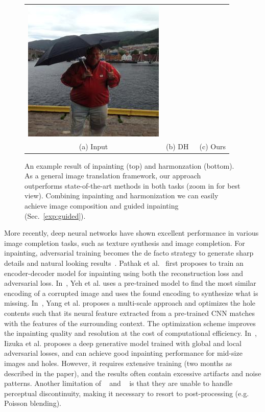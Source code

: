 \begin{figure}[t]
\begin{tabular}{ccc}
  \includegraphics[width=.34\textwidth]{figures/teaser/ours.jpg} \\
  (a) Input  & (b) DH~\cite{tsai2017deep} & (c) Ours  \\
\end{tabular}
\caption{An example result of inpainting (top) and harmonzation (bottom). As a general image translation framework, our approach outperforms state-of-the-art methods in both tasks (zoom in for best view). Combining inpainting and harmonization we can easily achieve image composition and guided inpainting (Sec.~\ref{exp:guided}).}
\label{fig:teaser}
\vspace{-10pt}
\end{figure}

More recently, deep neural networks have shown excellent performance in various image completion tasks, such as texture synthesis and image completion. For inpainting, adversarial training becomes the de facto strategy to generate sharp details and natural looking results~\cite{pathak2016context,yeh2016semantic,li2017generative,yang2017high,iizuka2017globally}. Pathak et al.~\cite{pathak2016context} first proposes to train an encoder-decoder model for inpainting using both the reconstruction loss and adversarial loss. In~\cite{yeh2016semantic}, Yeh et al. uses a pre-trained model to find the most similar encoding of a corrupted image and uses the found encoding to synthesize what is missing. In~\cite{yang2017high}, Yang et al. proposes a multi-scale approach and optimizes the hole contents such that its neural feature extracted from a pre-trained CNN matches with the features of the surrounding context. The optimization scheme improves the inpainting quality and resolution at the cost of computational efficiency. In~\cite{iizuka2017globally}, Iizuka et al. proposes a deep generative model trained with global and local adversarial losses, and can achieve good inpainting performance for mid-size images and holes. However, it requires extensive training (two months as described in the paper), and the results often contain excessive artifacts and noise patterns. Another limitation of ~\cite{yang2017high} and ~\cite{iizuka2017globally} is that they are unable to handle perceptual discontinuity, making it necessary to resort to post-processing (e.g. Poisson blending).

